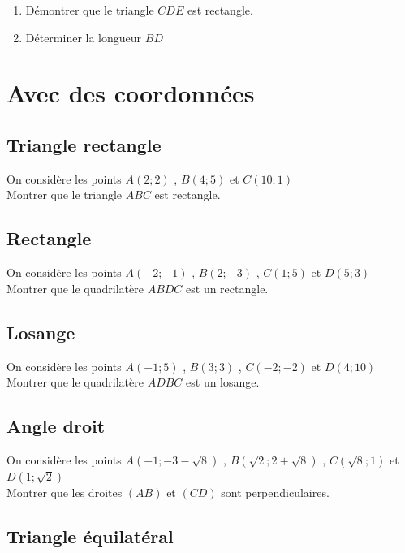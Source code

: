 \documentclass[oneside,12pt]{article}          %
\begin{document}
\vspace{-4mm}
\begin{enumerate}
	\item[6.] Démontrer que le triangle $CDE$ est rectangle.
    \item[7.] Déterminer la longueur $BD$
\end{enumerate}



\section{Avec des coordonnées}

\subsection{Triangle rectangle}

On considère les points $A(2;2)$ , $B(4;5)$ et $C(10;1)$\\
Montrer que le triangle $ABC$ est rectangle.



\subsection{Rectangle}

On considère les points $A(-2;-1)$ , $B(2;-3)$ , $C(1;5)$ et $D(5;3)$\\
Montrer que le quadrilatère $ABDC$ est un rectangle.



\subsection{Losange}

On considère les points $A(-1;5)$ , $B(3;3)$ , $C(-2;-2)$ et $D(4;10)$\\
Montrer que le quadrilatère $ADBC$ est un losange.



\subsection{Angle droit}

On considère les points $A(-1;-3-\sqrt{8})$ , $B(\sqrt{2};2+\sqrt{8})$ , $C(\sqrt{8};1)$ et $D(1;\sqrt{2})$\\
Montrer que les droites $(AB)$ et $(CD)$ sont perpendiculaires.



\subsection{Triangle équilatéral}
\end{document}
